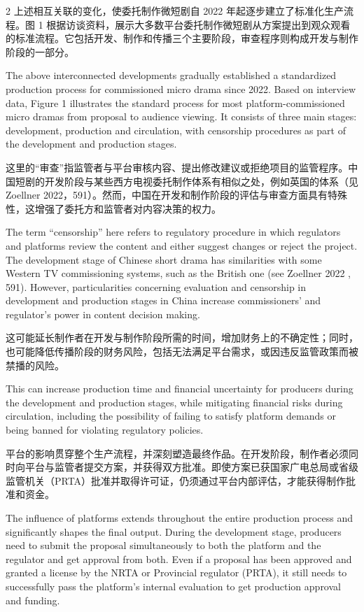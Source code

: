 \documentclass[10pt,a4paper]{article}
\begin{document}
\begin{paracol}{2}
\switchcolumn*
上述相互关联的变化，使委托制作微短剧自 2022 年起逐步建立了标准化生产流程。图 1 根据访谈资料，展示大多数平台委托制作微短剧从方案提出到观众观看的标准流程。它包括开发、制作和传播三个主要阶段，审查程序则构成开发与制作阶段的一部分。\par
\switchcolumn
The above interconnected developments gradually established a standardized production process for commissioned micro drama since 2022. Based on interview data, Figure 1 illustrates the standard process for most platform-commissioned micro dramas from proposal to audience viewing. It consists of three main stages: development, production and circulation, with censorship procedures as part of the development and production stages.\par
\switchcolumn*
这里的“审查”指监管者与平台审核内容、提出修改建议或拒绝项目的监管程序。中国短剧的开发阶段与某些西方电视委托制作体系有相似之处，例如英国的体系（见 Zoellner 2022，591）。然而，中国在开发和制作阶段的评估与审查方面具有特殊性，这增强了委托方和监管者对内容决策的权力。\par
\switchcolumn
The term “censorship” here refers to regulatory procedure in which regulators and platforms review the content and either suggest changes or reject the project. The development stage of Chinese short drama has similarities with some Western TV commissioning systems, such as the British one (see Zoellner 2022 , 591). However, particularities concerning evaluation and censorship in development and production stages in China increase commissioners’ and regulator’s power in content decision making.\par
\switchcolumn*
这可能延长制作者在开发与制作阶段所需的时间，增加财务上的不确定性；同时，也可能降低传播阶段的财务风险，包括无法满足平台需求，或因违反监管政策而被禁播的风险。\par
\switchcolumn
This can increase production time and financial uncertainty for producers during the development and production stages, while mitigating financial risks during circulation, including the possibility of failing to satisfy platform demands or being banned for violating regulatory policies.\par
\switchcolumn*
平台的影响贯穿整个生产流程，并深刻塑造最终作品。在开发阶段，制作者必须同时向平台与监管者提交方案，并获得双方批准。即使方案已获国家广电总局或省级监管机关（PRTA）批准并取得许可证，仍须通过平台内部评估，才能获得制作批准和资金。\par
\switchcolumn
The influence of platforms extends throughout the entire production process and significantly shapes the final output. During the development stage, producers need to submit the proposal simultaneously to both the platform and the regulator and get approval from both. Even if a proposal has been approved and granted a license by the NRTA or Provincial regulator (PRTA), it still needs to successfully pass the platform’s internal evaluation to get production approval and funding.\par

\end{paracol}
\end{document}
